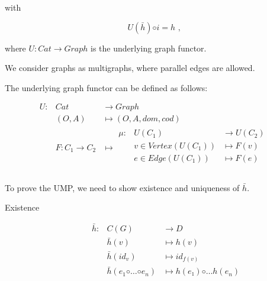 \documentclass{article}
\begin{document}
\begin{enumerate}
{with

 $$U(\bar{h}) ◦ i = h\text{ ,}$$
 
where $U : Cat → Graph$ is the underlying graph functor.

}

    We consider graphs as multigraphs, where parallel edges are allowed.

    The underlying graph functor can be defined as follows:

    \begin{equation*}
    \begin{array}{rll}
    U : & Cat         & → Graph            \\
        & (O, A)      & \mapsto (O, A, dom, cod) \\
        & F : C_1 → C_2 & \mapsto
            \begin{array}{rll}
              μ : & U(C_1)       & → U(C_2)                 \\
                  & v ∈ Vertex(U(C_1))     & \mapsto F(v)                  \\
                  & e ∈ Edge(U(C_1))       & \mapsto F(e) \\ 
            \end{array}
            \\
    \end{array}
    \end{equation*}

    To prove the UMP, we need to show existence and uniqueness of $\bar{h}$.
    
    \begin{description}
      \item[Existence]

        \begin{equation*}
          \begin{array}{rll}
            \bar{h} : & C(G)    & → D                                     \\
                      & \bar{h}(v)                & \mapsto  h(v)               \\                
                      & \bar{h}(id_v)             & \mapsto  id_{f(v)}            \\                
                      & \bar{h}(e_1 ◦ … ◦ e_n)    & \mapsto  h(e₁) ◦ … h(e_n)    \\                
          \end{array}
        \end{equation*}


\end{description}
\end{enumerate}
\end{document}
